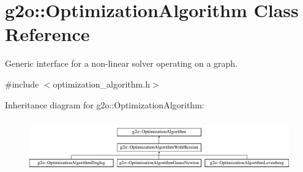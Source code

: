\hypertarget{classg2o_1_1_optimization_algorithm}{}\section{g2o\+:\+:Optimization\+Algorithm Class Reference}
\label{classg2o_1_1_optimization_algorithm}


Generic interface for a non-\/linear solver operating on a graph.  




{\ttfamily \#include $<$optimization\+\_\+algorithm.\+h$>$}

Inheritance diagram for g2o\+:\+:Optimization\+Algorithm\+:\begin{figure}[H]
\begin{center}
\leavevmode
\includegraphics[height=2.285714cm]{classg2o_1_1_optimization_algorithm}
\end{center}
\end{figure}
